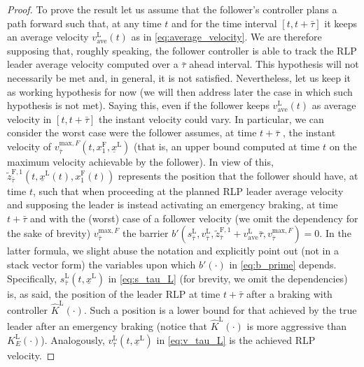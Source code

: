 \documentclass[letterpaper, 10 pt, conference]{ieeeconf}
\theoremstyle{definition}
\theoremstyle{nopoint}
\begin{document}
\begin{proof}
To prove the result let us assume that the follower's controller plans a path forward such that, at any time $t$ and for the time interval $[t, t+\bar{\tau}]$ it keeps an average velocity $v_{\mathrm{ave}}^\mathrm{L}(t)$ as in  \eqref{eq:average_velocity}.
We are therefore supposing that, roughly speaking, the follower controller is able to track the RLP leader average velocity  computed over a $\bar{\tau}$ ahead interval. This hypothesis will not necessarily be met and, in general, it is not satisfied. Nevertheless, let us keep it as working hypothesis for now (we will then address later the case in which such hypothesis is not met).
Saying this, even if the follower keeps $v_{\mathrm{ave}}^\mathrm{L}(t)$ as average velocity in $[t, t+\bar{\tau}]$ the instant velocity could vary. In particular, we can consider the worst case were the follower assumes, at time $t+\bar{\tau}$ , the instant velocity of $v_{\bar{\tau}}^{\mathrm{max}, F}(t, x_1^\mathrm{F}, \underline{x}^\mathrm{L})$ (that is, an upper bound computed at time $t$ on the maximum velocity achievable by the follower).
In view of this, $\tilde{z}^{\mathrm{F},1}_{\bar{\tau}} (t,\underline{x}^\mathrm{L}(t),x_1^\mathrm{F}(t))$ represents the position that the follower should have, at time $t$, such that when proceeding at the planned RLP leader average velocity and supposing the leader is instead activating an emergency braking, at time $t+\bar{\tau}$ and with the (worst) case of a follower velocity (we omit the dependency for the sake of brevity) $v_{\bar{\tau}}^{\mathrm{max}, F}$ the barrier $b'(s_{\bar{\tau}}^\mathrm{L},v_{\bar{\tau}}^\mathrm{L},\tilde{z}^{\mathrm{F},1}_{\bar{\tau}}+v_{\mathrm{ave}}^\mathrm{L}\bar{\tau},v_{\bar{\tau}}^{\mathrm{max}, F})=0$. In the latter formula, we slight abuse the notation and explicitly point out (not in a stack vector form) the variables upon which $b'(\cdot)$ in \eqref{eq:b_prime} depends. Specifically,  $s_{\bar{\tau}}^\mathrm{L}\left( t,\underline{x}^\mathrm{L} \right)$ in \eqref{eq:s_tau_L} (for brevity, we omit the dependencies) is, as said, the position of the leader RLP at time $t+\bar{\tau}$ after a braking with controller $\hat{K}^\mathrm{L}(\cdot)$. Such a position is a lower bound for that achieved by the true leader after an emergency braking (notice that $\hat{K}^\mathrm{L}(\cdot)$ is  more aggressive than $K^\mathrm{L}_E(\cdot)$). Analogously, $v_{\bar{\tau}}^\mathrm{L}\left( t,\underline{x}^\mathrm{L} \right)$  in \eqref{eq:v_tau_L} is the achieved RLP velocity. 


\end{proof}
\end{document}
